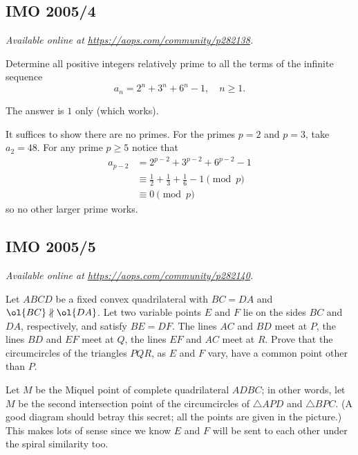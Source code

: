\documentclass[11pt]{scrartcl}
\begin{document}
\subsection{IMO 2005/4}
\textsl{Available online at \url{https://aops.com/community/p282138}.}
\begin{mdframed}[style=mdpurplebox,frametitle={Problem statement}]
Determine all positive integers relatively
prime to all the terms of the infinite sequence
\[ a_n = 2^n+3^n+6^n-1, \quad n \ge 1. \]
\end{mdframed}
The answer is $1$ only (which works).

It suffices to show there are no primes.
For the primes $p=2$ and $p=3$, take $a_2=48$.
For any prime $p \ge 5$ notice that
\begin{align*}
  a_{p-2} &= 2^{p-2} + 3^{p-2} + 6^{p-2} - 1 \\
  &\equiv \frac 12 + \frac 13 + \frac 16 - 1 \pmod p \\
  &\equiv 0 \pmod p
\end{align*}
so no other larger prime works.
\pagebreak

\subsection{IMO 2005/5}
\textsl{Available online at \url{https://aops.com/community/p282140}.}
\begin{mdframed}[style=mdpurplebox,frametitle={Problem statement}]
Let $ABCD$ be a fixed convex quadrilateral
with $BC=DA$ and $\ol{BC} \nparallel \ol{DA}$.
Let two variable points $E$ and $F$ lie on the
sides $BC$ and $DA$, respectively, and satisfy $BE=DF$.
The lines $AC$ and $BD$ meet at $P$,
the lines $BD$ and $EF$ meet at $Q$,
the lines $EF$ and $AC$ meet at $R$.
Prove that the circumcircles of the triangles $PQR$,
as $E$ and $F$ vary, have a common point other than $P$.
\end{mdframed}
Let $M$ be the Miquel point of complete quadrilateral $ADBC$;
in other words, let $M$ be the second intersection point
of the circumcircles of $\triangle APD$ and $\triangle BPC$.
(A good diagram should betray this secret;
all the points are given in the picture.)
This makes lots of sense since we know $E$ and $F$
will be sent to each other under the spiral similarity too.
\end{document}
